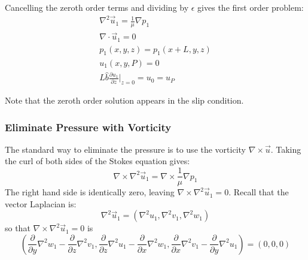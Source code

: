 \documentclass[12pt, a4paper, twoside, openright]{book}
\begin{document}
Cancelling the zeroth order terms and dividing by $\epsilon$ gives the first order problem:
\begin{gather}
\nabla^2 \vec{u}_1 = \frac{1}{\mu} \nabla p_1 \\
\nabla \cdot \vec{u}_1 = 0  \\
p_1(x,y,z) = p_1(x+L,y,z) \\
u_1(x,y,P) = 0 \\ 
L \hat{b} \frac{\partial u_1}{\partial z} \rvert_{z=0} = u_0 =  u_P
\end{gather}

Note that the zeroth order solution appears in the slip condition.

\subsubsection*{Eliminate Pressure with Vorticity}

The standard way to eliminate the pressure is to use the vorticity $\nabla \times \vec{u}$.
Taking the curl of both sides of the Stokes equation gives:
\begin{equation}
\nabla \times \nabla^2 \vec{u}_1  = \nabla \times \frac{1}{\mu} \nabla p_1 
\end{equation}
The right hand side is identically zero, leaving $ \nabla \times \nabla^2 \vec{u}_1 = 0 $.
Recall that the vector Laplacian is:
\begin{equation}
\nabla^2 \vec{u}_1 = \left( \nabla^2 u_1, \nabla^2 v_1, \nabla^2 w_1 \right)
\end{equation}
so that $  \nabla \times \nabla^2 \vec{u}_1 = 0 $ is
\begin{equation}
\left( 
\frac{\partial}{\partial y} \nabla^2 w_1 - \frac{\partial}{\partial z} \nabla^2 v_1,
\frac{\partial}{\partial z} \nabla^2 u_1 - \frac{\partial}{\partial x} \nabla^2 w_1,
\frac{\partial}{\partial x} \nabla^2 v_1 - \frac{\partial}{\partial y} \nabla^2 u_1
\right) = (0,0,0)
\end{equation}
\end{document}
